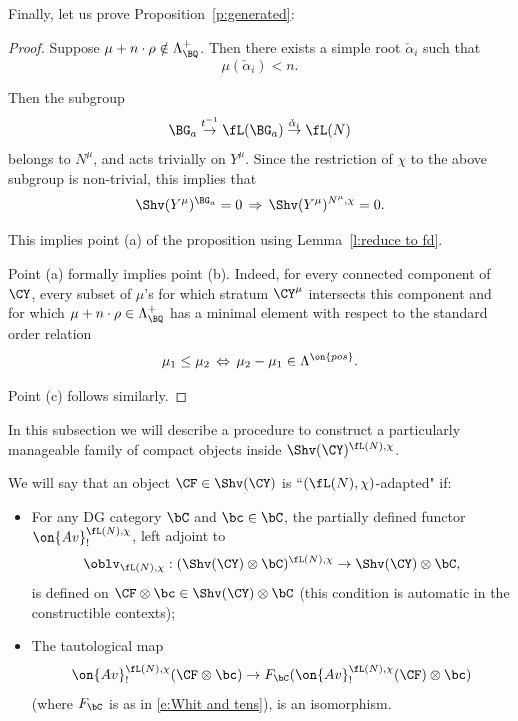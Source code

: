 \documentclass[9pt]{amsart}
\theoremstyle{definition}
\theoremstyle{remark}
\newcommand{\lemref}[1]{Lemma~\ref{#1}}
\newcommand{\propref}[1]{Proposition~\ref{#1}}
\numberwithin{equation}{section}
\begin{document}
Finally, let us prove \propref{p:generated}:

\begin{proof} 

Suppose $\mu+n\cdot \rho\notin \Lambda^+_\BQ$. Then there exists a simple
root $\check\alpha_i$ such that
$$\mu(\check\alpha_i)<n.$$

Then the subgroup 
$$\BG_a \overset{t^{-1}}\to \fL(\BG_a) \overset{\check\alpha_i}\to \fL(N)$$
belongs to $N^\mu$, and acts trivially on $Y^\mu$. Since the restriction of $\chi$
to the above subgroup is non-trivial, this implies that 
$$\Shv(Y^\mu)^{\BG_a}=0\,\Rightarrow\, \Shv(Y^\mu)^{N^\mu,\chi}=0.$$

This implies point (a) of the proposition using \lemref{l:reduce to fd}.

\medskip

Point (a) formally implies point (b). Indeed, for every connected component of $\CY$, every subset of $\mu$'s for 
which stratum $\CY^\mu$ intersects this component and for which $\mu+n\cdot \rho\in \Lambda^+_\BQ$
has a minimal element with respect to the standard order relation 
$$\mu_1\leq \mu_2\, \Leftrightarrow\, \mu_2-\mu_1\in \Lambda^{\on{pos}}.$$

\medskip

Point (c) follows similarly. 

\end{proof} 

 \label{ss:enough}

In this subsection we will describe a procedure to construct a particularly manageable family of compact objects inside $\Shv(\CY)^{\fL(N),\chi}$. 

\sssec{}

We will say that an object $\CF\in \Shv(\CY)$ is ``$(\fL(N),\chi)$-adapted" if:

\begin{itemize}

\item For any DG category $\bC$ and $\bc\in \bC$, the partially defined 
functor $\on{Av}^{\fL(N),\chi}_!$, left adjoint to 
$$\oblv_{\fL(N),\chi}: (\Shv(\CY)\otimes \bC)^{\fL(N),\chi}\to \Shv(\CY)\otimes \bC,$$
is defined on $\CF\otimes \bc\in \Shv(\CY)\otimes \bC$ (this condition is automatic in the constructible contexts);

\medskip

\item The tautological map
$$\on{Av}^{\fL(N),\chi}_!(\CF\otimes \bc)\to F_\bC(\on{Av}^{\fL(N),\chi}_!(\CF)\otimes \bc)$$
(where $F_\bC$ is as in \eqref{e:Whit and tens}), is an isomorphism.

\end{itemize}
\end{document}
